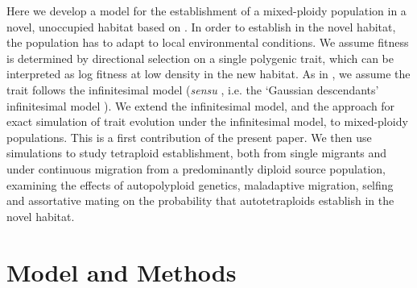 \documentclass[12pt,a4paper]{article}
\begin{document}
    Here we develop a model for the establishment of a mixed-ploidy population in a
    novel, unoccupied habitat based on \cite{barton2018}.
    In order to establish in the novel habitat, the population has to adapt to
    local environmental conditions.
    We assume fitness is determined by directional selection on a single polygenic
    trait, which can be interpreted as log fitness at low density in the new
    habitat.
    As in \cite{barton2018}, we assume the trait follows the infinitesimal
    model (\textit{sensu} \cite{barton2017}, i.e. the `Gaussian descendants'
    infinitesimal model \citep{turelli2017}).
    We extend the infinitesimal model, and the approach for exact simulation of
    trait evolution under the infinitesimal model, to mixed-ploidy populations.
    This is a first contribution of the present paper.
    We then use simulations to study tetraploid establishment, both from single
    migrants and under continuous migration from a predominantly diploid source
    population, examining the effects of autopolyploid genetics,
    maladaptive migration, selfing and assortative mating on the probability that
    autotetraploids establish in the novel habitat.


    \section*{Model and Methods}
\end{document}

